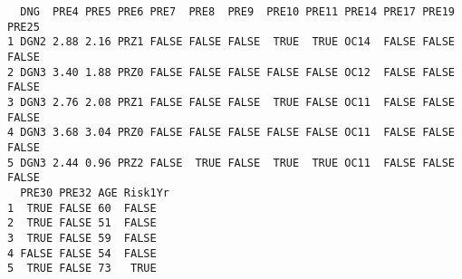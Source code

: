 \documentclass[12pt]{article}
\begin{document}
\begin{verbatim}
  DNG  PRE4 PRE5 PRE6 PRE7  PRE8  PRE9  PRE10 PRE11 PRE14 PRE17 PRE19 PRE25
1 DGN2 2.88 2.16 PRZ1 FALSE FALSE FALSE  TRUE  TRUE OC14  FALSE FALSE FALSE
2 DGN3 3.40 1.88 PRZ0 FALSE FALSE FALSE FALSE FALSE OC12  FALSE FALSE FALSE
3 DGN3 2.76 2.08 PRZ1 FALSE FALSE FALSE  TRUE FALSE OC11  FALSE FALSE FALSE
4 DGN3 3.68 3.04 PRZ0 FALSE FALSE FALSE FALSE FALSE OC11  FALSE FALSE FALSE
5 DGN3 2.44 0.96 PRZ2 FALSE  TRUE FALSE  TRUE  TRUE OC11  FALSE FALSE FALSE
  PRE30 PRE32 AGE Risk1Yr
1  TRUE FALSE 60  FALSE  
2  TRUE FALSE 51  FALSE  
3  TRUE FALSE 59  FALSE  
4 FALSE FALSE 54  FALSE  
5  TRUE FALSE 73   TRUE  
\end{verbatim}
\end{document}
